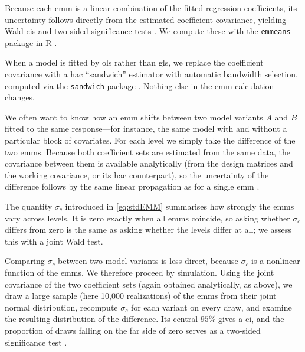Because each \gls{emm} is a linear combination of the fitted
regression coefficients, its uncertainty follows directly from the estimated
coefficient covariance, yielding Wald \glspl{ci} and two-sided
significance tests \parencite{searleLinearModelsUnbalanced1987}. We compute
these with the \texttt{emmeans} package in R
\parencite{lenthEmmeansEstimatedMarginal2026}.

When a model is fitted by \gls{ols} rather than \gls{gls}, we replace the
coefficient covariance with a
\gls{hac} \enquote{sandwich} estimator
\parencite{whiteHeteroskedasticityconsistentCovarianceMatrix1980,
    neweySimplePositiveSemidefinite1987, neweyAutomaticLagSelection1994} with
automatic bandwidth selection, computed via the \texttt{sandwich} package
\parencite{zeileisObjectorientedComputationSandwich2006,
    zeileisVariousVersatileVariances2020}. Nothing else in the \gls{emm} calculation
changes.

We often want to know how an \gls{emm} shifts between two model variants $A$ and $B$
fitted to the same response---for instance, the same model with and without a
particular block of covariates. For each level we simply take the difference of
the two \glspl{emm}. Because both coefficient sets are estimated from the same data,
the covariance between them is available analytically (from the design matrices
and the working covariance, or its \gls{hac} counterpart), so the uncertainty of the
difference follows by the same linear propagation as for a single \gls{emm}
\parencite{goldsteinGraphicalPresentationCollection1995}.

The quantity $\sigma_c$ introduced in \cref{eq:stdEMM} summarises how
strongly the \glspl{emm} vary across levels. It is zero exactly when all \glspl{emm} coincide,
so asking whether $\sigma_c$ differs from zero is the same as asking whether the
levels differ at all; we assess this with a joint Wald test.

Comparing $\sigma_c$ between two model variants is less direct, because
$\sigma_c$ is a nonlinear function of the \glspl{emm}. We therefore proceed by
simulation. Using the joint covariance of the two coefficient sets (again
obtained analytically, as above), we draw a large sample (here 10,000 realizations) of the \glspl{emm} from their joint normal distribution, recompute
$\sigma_c$ for each variant on every draw, and examine the resulting
distribution of the difference. Its central $95\%$ gives a \gls{ci},
and the proportion of draws falling on the far side of zero serves as a
two-sided significance test \parencite{davisonBootstrapMethodsTheir1997}.

